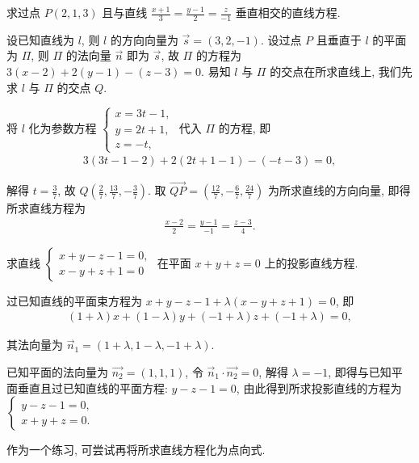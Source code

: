 \begin{example}
	求过点 $P(2,1,3)$ 且与直线 $\frac{x+1}{3}=\frac{y-1}{2}=\frac{z}{-1}$ 垂直相交的直线方程.
\end{example}
\begin{solution}
	设已知直线为 $l$, 则 $l$ 的方向向量为 $\vec{s}=(3,2,-1)$.
	设过点 $P$ 且垂直于 $l$ 的平面为 $\Pi$, 则 $\Pi$ 的法向量 $\vec{n}$ 即为 $\vec{s}$, 故 $\Pi$ 的方程为 $3(x-2)+2(y-1)-(z-3)=0$.
	易知 $l$ 与 $\Pi$ 的交点在所求直线上, 我们先求 $l$ 与 $\Pi$ 的交点 $Q$.

	将 $l$ 化为参数方程 $\left\{\begin{array}{l}x=3 t-1, \\ y=2 t+1, \\ z=-t,\end{array}\right.$ 代入 $\Pi$ 的方程, 即
	\begin{align*}
		3(3 t-1-2)+2(2 t+1-1)-(-t-3)=0,
	\end{align*}

	解得 $t=\frac{3}{7}$, 故 $Q\left(\frac{2}{7}, \frac{13}{7},-\frac{3}{7}\right)$.
	取 $\overrightarrow{Q P}=\left(\frac{12}{7},-\frac{6}{7}, \frac{24}{7}\right)$ 为所求直线的方向向量, 即得所求直线方程为
	\begin{align*}
		\frac{x-2}{2}=\frac{y-1}{-1}=\frac{z-3}{4} .
	\end{align*}
\end{solution}

\begin{example}
	求直线 $\left\{\begin{array}{l}x+y-z-1=0, \\ x-y+z+1=0\end{array}\right.$ 在平面 $x+y+z=0$ 上的投影直线方程.
\end{example}
\begin{solution}
	过已知直线的平面束方程为 $x+y-z-1+\lambda(x-y+z+1)=0$, 即
	\begin{align*}
		(1+\lambda) x+(1-\lambda) y+(-1+\lambda) z+(-1+\lambda)=0,
	\end{align*}

	其法向量为 $\vec{n}_1=(1+\lambda, 1-\lambda,-1+\lambda)$.

	已知平面的法向量为 $\overrightarrow{n_2}=(1,1,1)$, 令 $\vec{n}_1 \cdot \overrightarrow{n_2}=0$, 解得 $\lambda=-1$, 即得与已知平面垂直且过已知直线的平面方程: $y-z-1=0$, 由此得到所求投影直线的方程为 $\left\{\begin{array}{l}y-z-1=0, \\ x+y+z=0 .\end{array}\right.$
\end{solution}
\begin{note}
	作为一个练习, 可尝试再将所求直线方程化为点向式.
\end{note}

